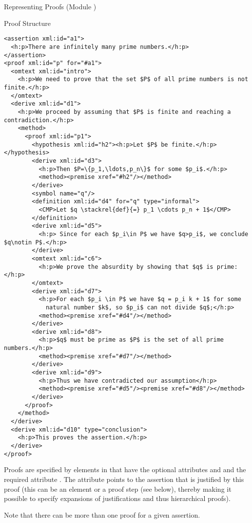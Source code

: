 \begin{omgroup}[id=proofs,short=Representing Proofs]{Representing Proofs (Module {})}
\begin{module}[id=proof-structure]
\begin{omgroup}[id=proof-text]{Proof Structure}
\begin{lstlisting}[label=lst:primes-omdoc-text,mathescape,
  caption={An \omdoc Representation of {\myfigref{pf-example1-math}}.},
  index={symbol,definition}]
<assertion xml:id="a1">
  <h:p>There are infinitely many prime numbers.</h:p>
</assertion>
<proof xml:id="p" for="#a1">
  <omtext xml:id="intro">
    <h:p>We need to prove that the set $P$ of all prime numbers is not finite.</h:p>
  </omtext>
  <derive xml:id="d1">
    <h:p>We proceed by assuming that $P$ is finite and reaching a contradiction.</h:p>
    <method>
      <proof xml:id="p1">
        <hypothesis xml:id="h2"><h:p>Let $P$ be finite.</h:p></hypothesis>
        <derive xml:id="d3">
          <h:p>Then $P=\{p_1,\ldots,p_n\}$ for some $p_i$.</h:p>
          <method><premise xref="#h2"/></method>
        </derive>
        <symbol name="q"/>
        <definition xml:id="d4" for="q" type="informal">
          <CMP>Let $q \stackrel{def}{=} p_1 \cdots p_n + 1$</CMP>
        </definition>
        <derive xml:id="d5">
          <h:p> Since for each $p_i\in P$ we have $q>p_i$, we conclude $q\notin P$.</h:p>
        </derive>  
        <omtext xml:id="c6">
          <h:p>We prove the absurdity by showing that $q$ is prime:</h:p>
        </omtext>  
        <derive xml:id="d7">
          <h:p>For each $p_i \in P$ we have $q = p_i k + 1$ for some
            natural number $k$, so $p_i$ can not divide $q$;</h:p>
          <method><premise xref="#d4"/></method>
        </derive>
        <derive xml:id="d8">
          <h:p>$q$ must be prime as $P$ is the set of all prime numbers.</h:p> 
          <method><premise xref="#d7"/></method>
        </derive>
        <derive xml:id="d9">
          <h:p>Thus we have contradicted our assumption</h:p>
          <method><premise xref="#d5"/><premise xref="#d8"/></method>
        </derive>  
      </proof>
    </method>
  </derive>  
  <derive xml:id="d10" type="conclusion">
    <h:p>This proves the assertion.</h:p>
  </derive>  
</proof>
\end{lstlisting}
\begin{definition}[id=proof.def]
  Proofs are specified by {} elements in \omdoc that have the optional
  attributes  and  and the
  required attribute . The  attribute
  points to the assertion that is justified by this proof (this can be an
   element or a  proof step (see below), thereby
  making it possible to specify expansions of justifications and thus hierarchical
  proofs).
\end{definition}
Note that there can be more than one proof for a given assertion.


\end{omgroup}
\end{module}
\end{omgroup}
